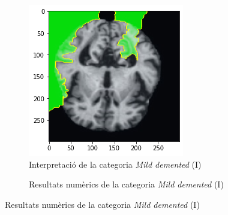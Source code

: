 \documentclass[a4paper,12pt]{article}
\begin{document}
\begin{figure}[h!]
    \centering
    \begin{subfigure}[b]{0.40\linewidth}
        \includegraphics[width=\linewidth]{images/Mild.png}
        \caption{Interpretació de la categoria \textit{Mild demented} (I)}
        \label{fig:MD1}
    \end{subfigure}
    \begin{subfigure}[b]{0.40\linewidth}
        \caption{Resultats numèrics de la categoria \textit{Mild demented} (I)}
        \label{fig:ClassificacioMD1}

\end{subfigure}
\end{figure}
\end{document}
